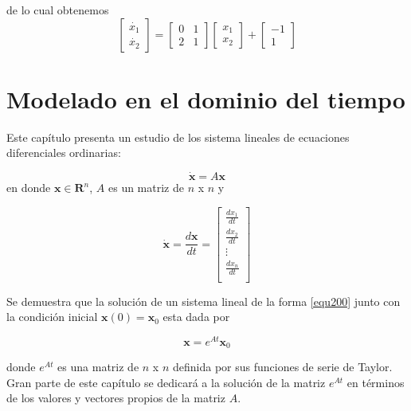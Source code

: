 \documentclass[12pt]{book}
\theoremstyle{definition}
\theoremstyle{remark}
\theoremstyle{plain}
\begin{document}
de lo cual obtenemos
\begin{equation*}
 \begin{bmatrix}
\dot{x_1}\\
\dot{x_2}
\end{bmatrix}=
\begin{bmatrix}
0 & 1\\
2 & 1
\end{bmatrix}
 \begin{bmatrix}
x_1\\
x_2
\end{bmatrix}
+
 \begin{bmatrix}
-1\\
1
\end{bmatrix}
\end{equation*}

\chapter{Modelado en el dominio del tiempo}

Este capítulo presenta un estudio de los sistema lineales de ecuaciones diferenciales ordinarias:

\begin{equation}
\label{equ200}
\mathbf{\dot{x}}=A \mathbf{x}
\end{equation}
en donde $\mathbf{x}\in \mathbf{R}^n$, $A$ es un matriz de $n$ x $n$ y

\begin{equation}
\label{equ201}
\mathbf{\dot{x}}=\frac{d\mathbf{x}}{dt}= \begin{bmatrix}
\frac{dx_1}{dt}\\
\frac{dx_2}{dt}\\
\vdots \\
\frac{dx_n}{dt}\\
\end{bmatrix}
\end{equation}

Se demuestra que la solución de un sistema lineal de la forma \ref{equ200} junto con la condición inicial $\mathbf{x}(0)=\mathbf{x}_0 $ esta dada por

\begin{equation*}
\mathbf{x} = e^{A t}\mathbf{x}_0
\end{equation*}

donde $e^{A t}$ es una matriz de $n$ x $n$ definida por sus funciones de serie de Taylor. Gran parte de este capítulo se dedicará a la solución de la matriz $e^{A t}$ en términos de los valores y vectores propios de la matriz $A$.
\end{document}
